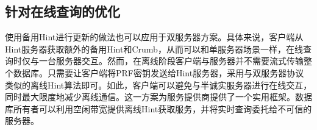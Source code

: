 \subsection{针对在线查询的优化}
\label{sec:optimized-model}
使用备用Hint进行更新的做法也可以应用于双服务器方案。具体来说，客户端从Hint服务器获取额外的备用Hint和Crumb，从而可以和单服务器场景一样，在线查询时仅与一台服务器交互。然而，在离线阶段客户端与服务器并不需要流式传输整个数据库。只需要让客户端将PRF密钥发送给Hint服务器，采用与双服务器协议类似的离线Hint算法即可。如此，客户端可以避免与半诚实服务器进行在线交互，同时最大限度地减少离线通信。这一方案为服务提供商提供了一个实用框架。数据库所有者可以利用空闲带宽提供离线Hint获取服务，并将实时查询委托给不可信的服务器。
